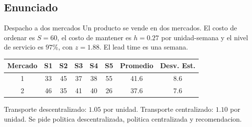 \subsection{Enunciado}

\begin{enunciado}{Despacho a dos mercados}
Un producto se vende en dos mercados. El costo de ordenar es \(S=60\), el costo de mantener es \(h=0.27\) por unidad-semana y el nivel de servicio es \(97\%\), con \(z=1.88\). El lead time es una semana.

\begin{center}
\begin{tabular}{cccccccc}
\toprule
Mercado & S1 & S2 & S3 & S4 & S5 & Promedio & Desv. Est. \\
\midrule
1 & 33 & 45 & 37 & 38 & 55 & 41.6 & 8.6 \\
2 & 46 & 35 & 41 & 40 & 26 & 37.6 & 7.6 \\
\bottomrule
\end{tabular}
\end{center}

Transporte descentralizado: \(1.05\) por unidad. Transporte centralizado: \(1.10\) por unidad. Se pide politica descentralizada, politica centralizada y recomendacion.
\end{enunciado}
